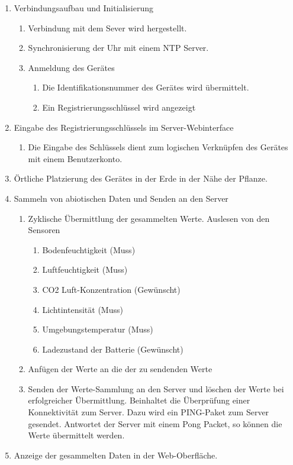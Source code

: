 \documentclass[pointlessnumbers]{scrartcl}
\begin{document}
\begin{enumerate}
    \item Verbindungsaufbau und Initialisierung
    \begin{enumerate}
        \item Verbindung mit dem Sever wird hergestellt. 
        \item Synchronisierung der Uhr mit einem NTP Server. 
        \item Anmeldung des Gerätes 
            \begin{enumerate}
                \item Die Identifikationsnummer des Gerätes wird übermittelt. 
                \item Ein Registrierungsschlüssel wird angezeigt             
            \end{enumerate}
    \end{enumerate}      
        
    \item Eingabe des Registrierungsschlüssels im Server-Webinterface    
    \begin{enumerate}
        \item Die Eingabe des Schlüssels dient zum logischen Verknüpfen des Gerätes mit einem Benutzerkonto.  
    \end{enumerate}
    
    \item Örtliche Platzierung des Gerätes in der Erde in der Nähe der Pflanze.  
    
    \item Sammeln von abiotischen Daten und Senden an den Server
    \begin{enumerate}
    \item Zyklische Übermittlung der gesammelten Werte. Auslesen von den Sensoren 
        \begin{enumerate}
        \item Bodenfeuchtigkeit (Muss)
        \item Luftfeuchtigkeit (Muss)
        \item CO2 Luft-Konzentration (Gewünscht)
        \item Lichtintensität (Muss)
        \item Umgebungstemperatur (Muss)
        \item Ladezustand der Batterie (Gewünscht)
        \end{enumerate}
    \item Anfügen der Werte an die der zu sendenden Werte 
    \item Senden der Werte-Sammlung an den Server und löschen der Werte bei erfolgreicher Übermittlung. Beinhaltet die Überprüfung einer Konnektivität zum Server. Dazu wird ein PING-Paket zum Server gesendet. Antwortet der Server mit einem Pong Packet, so können die Werte übermittelt werden.
    \end{enumerate}
    
    \item Anzeige der gesammelten Daten in der Web-Oberfläche.
  
\end{enumerate}
\end{document}
